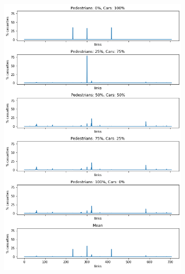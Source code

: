 \begin{figure}
    \centering
    \begin{subfigure}{0.475\textwidth}
        \centering
        \includegraphics[width=\textwidth]{images/analisi/base_links_casualties.png}
        \caption{}
    \end{subfigure}
    \hfill
    \begin{subfigure}{0.475\textwidth}
        \centering

\end{subfigure}
\end{figure}
